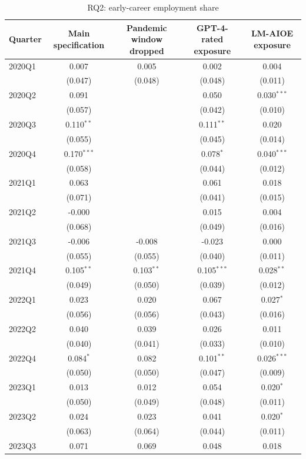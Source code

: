 \begin{table}[htbp]\centering
\caption{RQ2: early-career employment share}
\begin{tabular}{lcccc}
\toprule
Quarter & Main specification & Pandemic window dropped & GPT-4-rated exposure & LM-AIOE exposure \\
\midrule
2020Q1 & 0.007 & 0.005 & 0.002 & 0.004 \\
 & (0.047) & (0.048) & (0.048) & (0.011) \\
2020Q2 & 0.091 &  & 0.050 & 0.030$^{***}$ \\
 & (0.057) &  & (0.042) & (0.010) \\
2020Q3 & 0.110$^{**}$ &  & 0.111$^{**}$ & 0.020 \\
 & (0.055) &  & (0.045) & (0.014) \\
2020Q4 & 0.170$^{***}$ &  & 0.078$^{*}$ & 0.040$^{***}$ \\
 & (0.058) &  & (0.044) & (0.012) \\
2021Q1 & 0.063 &  & 0.061 & 0.018 \\
 & (0.071) &  & (0.041) & (0.015) \\
2021Q2 & -0.000 &  & 0.015 & 0.004 \\
 & (0.068) &  & (0.049) & (0.016) \\
2021Q3 & -0.006 & -0.008 & -0.023 & 0.000 \\
 & (0.055) & (0.055) & (0.040) & (0.011) \\
2021Q4 & 0.105$^{**}$ & 0.103$^{**}$ & 0.105$^{***}$ & 0.028$^{**}$ \\
 & (0.049) & (0.050) & (0.039) & (0.012) \\
2022Q1 & 0.023 & 0.020 & 0.067 & 0.027$^{*}$ \\
 & (0.056) & (0.056) & (0.043) & (0.016) \\
2022Q2 & 0.040 & 0.039 & 0.026 & 0.011 \\
 & (0.040) & (0.041) & (0.033) & (0.010) \\
2022Q4 & 0.084$^{*}$ & 0.082 & 0.101$^{**}$ & 0.026$^{***}$ \\
 & (0.050) & (0.050) & (0.047) & (0.009) \\
2023Q1 & 0.013 & 0.012 & 0.054 & 0.020$^{*}$ \\
 & (0.050) & (0.049) & (0.048) & (0.011) \\
2023Q2 & 0.024 & 0.023 & 0.041 & 0.020$^{*}$ \\
 & (0.063) & (0.064) & (0.044) & (0.011) \\
2023Q3 & 0.071 & 0.069 & 0.048 & 0.018 \\

\end{tabular}
\end{table}
